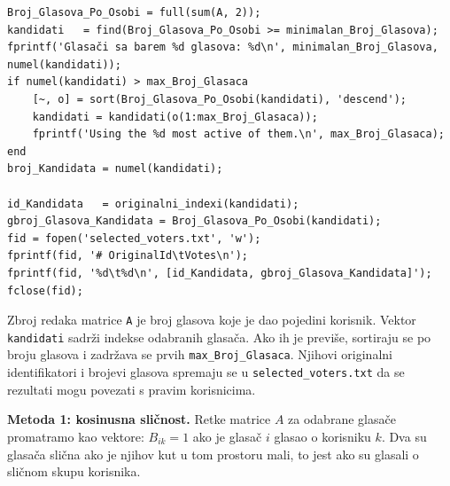 \documentclass[12pt, letterpaper]{article}
\numberwithin{figure}{section}
\begin{document}
\begin{lstlisting}[style=octave, caption={Odabir najaktivnijih glasača}, label={lst:wiki_odabir}]
Broj_Glasova_Po_Osobi = full(sum(A, 2));
kandidati   = find(Broj_Glasova_Po_Osobi >= minimalan_Broj_Glasova);
fprintf('Glasači sa barem %d glasova: %d\n', minimalan_Broj_Glasova, numel(kandidati));
if numel(kandidati) > max_Broj_Glasaca
    [~, o] = sort(Broj_Glasova_Po_Osobi(kandidati), 'descend');
    kandidati = kandidati(o(1:max_Broj_Glasaca));
    fprintf('Using the %d most active of them.\n', max_Broj_Glasaca);
end
broj_Kandidata = numel(kandidati);

id_Kandidata   = originalni_indexi(kandidati);
gbroj_Glasova_Kandidata = Broj_Glasova_Po_Osobi(kandidati);
fid = fopen('selected_voters.txt', 'w');
fprintf(fid, '# OriginalId\tVotes\n');
fprintf(fid, '%d\t%d\n', [id_Kandidata, gbroj_Glasova_Kandidata]');
fclose(fid);

\end{lstlisting}
Zbroj redaka matrice \texttt{A} je broj glasova koje je dao pojedini korisnik. Vektor \texttt{kandidati} sadrži indekse odabranih glasača. Ako ih je previše, sortiraju se po broju glasova i zadržava se prvih \texttt{max\_Broj\_Glasaca}. Njihovi originalni identifikatori i brojevi glasova spremaju se u \texttt{selected\_voters.txt} da se rezultati mogu povezati s pravim korisnicima.

\textbf{Metoda 1: kosinusna sličnost.} Retke matrice $A$ za odabrane glasače promatramo kao vektore: $B_{ik}=1$ ako je glasač $i$ glasao o korisniku $k$. Dva su glasača slična ako je njihov kut u tom prostoru mali, to jest ako su glasali o sličnom skupu korisnika.
\end{document}
